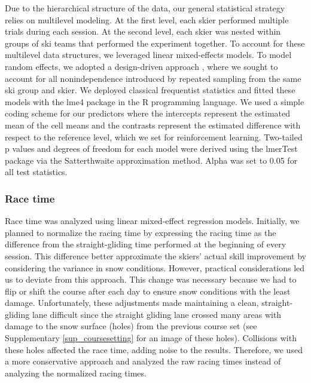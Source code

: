 \documentclass[pdflatex,sn-nature]{sn-jnl}%
\theoremstyle{thmstyleone}%
\theoremstyle{thmstyletwo}%
\theoremstyle{thmstylethree}%
\begin{document}
Due to the hierarchical structure of the data, our general statistical strategy relies on multilevel modeling. At the first level, each skier performed multiple trials during each session. At the second level, each skier was nested within groups of ski teams that performed the experiment together. To account for these multilevel data structures, we leveraged linear mixed-effects models. To model random effects, we adopted a design-driven approach \cite{barr_random_2013, barr_learning_2021}, where we sought to account for all nonindependence introduced by repeated sampling from the same ski group and skier. We deployed classical frequentist statistics and fitted these models with the lme4 package \cite{bates_fitting_2015} in the R \cite{r_core_team_r_2022}programming language. We used a simple coding scheme for our predictors where the intercepts represent the estimated mean of the cell means and the contrasts represent the estimated difference with respect to the reference level, which we set for reinforcement learning. Two-tailed p values and degrees of freedom for each model were derived using the lmerTest package \cite{kuznetsova_lmertest_2017} via the Satterthwaite approximation method. Alpha was set to 0.05 for all test statistics.

\subsubsection{Race time}

Race time was analyzed using linear mixed-effect regression models. Initially, we planned to normalize the racing time by expressing the racing time as the difference from the straight-gliding time performed at the beginning of every session. This difference better approximate the skiers' actual skill improvement by considering the variance in snow conditions. However, practical considerations led us to deviate from this approach. This change was necessary because we had to flip or shift the course after each day to ensure snow conditions with the least damage. Unfortunately, these adjustments made maintaining a clean, straight-gliding lane difficult since the straight gliding lane crossed many areas with damage to the snow surface (holes) from the previous course set (see Supplementary \ref{sup_coursesetting} for an image of these holes). Collisions with these holes affected the race time, adding noise to the results. Therefore, we used a more conservative approach and analyzed the raw racing times instead of analyzing the normalized racing times.
\end{document}
